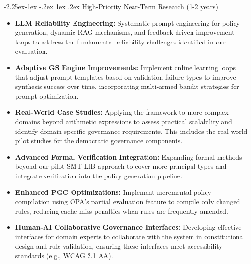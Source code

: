 \documentclass[manuscript,screen,review,anonymous,9pt]{acmart}
\makeatletter
\renewcommand\subsection{\@startsection{subsection}{2}{\z@}%
  {-2.25ex\@plus -1ex \@minus -.2ex}%
  {1ex \@plus .2ex}%
  {\normalfont\large\bfseries}}
\makeatother
\begin{document}
\subsection{High-Priority Near-Term Research (1-2 years)}
\label{subsec:near_term_research}
\begin{itemize}
	\item \textbf{LLM Reliability Engineering:} Systematic prompt engineering for policy generation, dynamic RAG mechanisms, and feedback-driven improvement loops to address the fundamental reliability challenges identified in our evaluation.
	\item \textbf{Adaptive GS Engine Improvements:} Implement online learning loops that adjust prompt templates based on validation-failure types to improve synthesis success over time, incorporating multi-armed bandit strategies for prompt optimization.
	\item \textbf{Real-World Case Studies:} Applying the framework to more complex domains beyond arithmetic expressions to assess practical scalability and identify domain-specific governance requirements. This includes the real-world pilot studies for the democratic governance components.
	\item \textbf{Advanced Formal Verification Integration:} Expanding formal methods beyond our pilot SMT-LIB approach to cover more principal types and integrate verification into the policy generation pipeline.
	\item \textbf{Enhanced PGC Optimizations:} Implement incremental policy compilation using OPA's partial evaluation feature to compile only changed rules, reducing cache-miss penalties when rules are frequently amended.
	\item \textbf{Human-AI Collaborative Governance Interfaces:} Developing effective interfaces for domain experts to collaborate with the system in constitutional design and rule validation, ensuring these interfaces meet accessibility standards (e.g., WCAG 2.1 AA).
\end{itemize}
\end{document}

